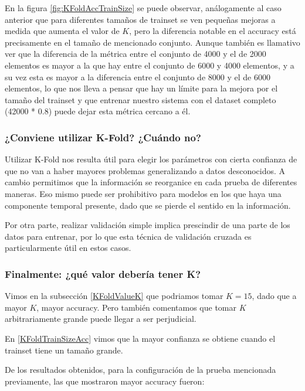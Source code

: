 En la figura \ref{fig:KFoldAccTrainSize} se puede observar, análogamente al caso anterior que para diferentes tamaños de trainset se ven pequeñas mejoras a medida que aumenta el valor de $K$, pero la diferencia notable en el accuracy está precisamente en el tamaño de mencionado conjunto. Aunque también es llamativo ver que la diferencia de la métrica entre el conjunto de 4000 y el de 2000 elementos es mayor a la que hay entre el conjunto de 6000 y 4000 elementos, y a su vez esta es mayor a la diferencia entre el conjunto de 8000 y el de 6000 elementos, lo que nos lleva a pensar que hay un límite para la mejora por el tamaño del trainset y que entrenar nuestro sistema con el dataset completo (42000 * 0.8) puede dejar esta métrica cercano a él.

\subsubsection{¿Conviene utilizar K-Fold? ¿Cuándo no?}

Utilizar K-Fold nos resulta útil para elegir los parámetros con cierta confianza de que no van a haber mayores problemas generalizando a datos desconocidos. A cambio permitimos que la información se reorganice en cada prueba de diferentes maneras. Eso mismo puede ser prohibitivo para modelos en los que haya una componente temporal presente, dado que se pierde el sentido en la información.

Por otra parte, realizar validación simple implica prescindir de una parte de los datos para entrenar, por lo que esta técnica de validación cruzada es particularmente útil en estos casos.

\subsubsection{Finalmente: ¿qué valor debería tener K?}

Vimos en la subsección \ref{KFoldValueK} que podriamos tomar $K=15$, dado que a mayor $K$, mayor accuracy. Pero también comentamos que tomar $K$ arbitrariamente grande puede llegar a ser perjudicial.

En \ref{KFoldTrainSizeAcc} vimos que la mayor confianza se obtiene cuando el trainset tiene un tamaño grande.

De los resultados obtenidos, para la configuración de la prueba mencionada previamente, las que mostraron mayor accuracy fueron:

